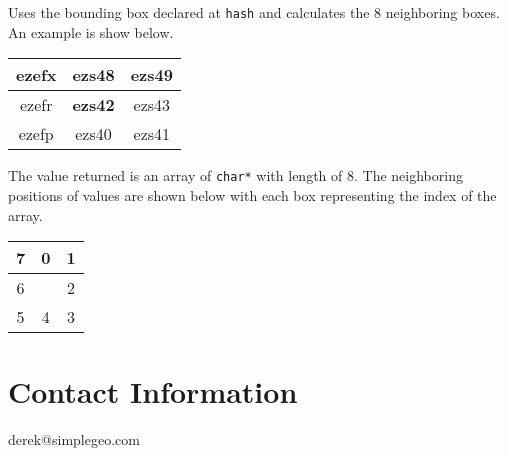 \documentclass{article}
\begin{document}
Uses the bounding box declared at \texttt{hash} and calculates the 8 neighboring boxes. An example is show below.

\begin{center}
\begin{tabular}{| c | c | c |}
\hline
ezefx & ezs48 & ezs49 \\ \hline
ezefr & \textbf{ezs42} & ezs43 \\ \hline
ezefp & ezs40 & ezs41 \\ \hline
\end{tabular}
\end{center}

The value returned is an array of \texttt{char*} with length of 8. The neighboring positions of values are shown below with each box representing the index of the array.

\begin{center}
\begin{tabular}{| c | c | c |}
\hline
7 & 0 & 1 \\ \hline
6 &  & 2 \\ \hline
5 & 4 & 3 \\ \hline
\end{tabular}
\end{center}


\section{Contact Information}
derek@simplegeo.com
\end{document}
